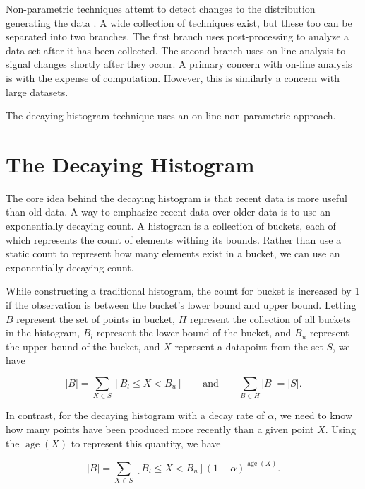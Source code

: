 \documentclass{sig-alternate}
\DeclareMathOperator{\age}{age}
\begin{document}
    Non-parametric techniques attemt to detect changes to the distribution
    generating the data \cite{brodsky1993nonparametric}. A wide collection of
    techniques exist, but these too can be separated into two branches. The
    first branch uses post-processing to analyze a data set after it has been
    collected. The second branch uses on-line analysis to signal changes shortly
    after they occur. A primary concern with on-line analysis is with the
    expense of computation. However, this is similarly a concern with large
    datasets.

    The decaying histogram technique uses an on-line non-parametric approach.

\section{The Decaying Histogram}
    The core idea behind the decaying histogram is that recent data is more
    useful than old data. A way to emphasize recent data over older data is to
    use an exponentially decaying count. A histogram is a collection of
    buckets, each of which represents the count of elements withing its bounds.
    Rather than use a static count to represent how many elements exist in a
    bucket, we can use an exponentially decaying count.

    While constructing a traditional histogram, the count for bucket is
    increased by 1 if the observation is between the bucket's lower bound and
    upper bound. Letting $B$ represent the set of points in bucket, $H$
    represent the collection of all buckets in the histogram, $B_l$
    represent the lower bound of the bucket, and $B_u$ represent
    the upper bound of the bucket, and $X$ represent a datapoint from the set
    $S$, we have

    \begin{displaymath}
        |B| = \sum_{X \in S} [B_l \leq X < B_u]
    \qquad
    \mbox{and}
    \qquad
        \sum_{B \in H} |B| = |S|.
    \end{displaymath}

    In contrast, for the decaying histogram with a decay rate of $\alpha$, we
    need to know how many points have been produced more recently than a given
    point $X$. Using the $\age(X)$ to represent this quantity, we have

    \begin{displaymath}
        |B| = \sum_{X \in S} [B_l \leq X < B_u] (1 - \alpha)^{\age(X)} .
    \end{displaymath}
\end{document}
